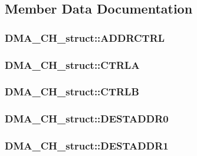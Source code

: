 \subsection{Member Data Documentation}
\hypertarget{struct_d_m_a___c_h__struct_ac9ba7423a26633cd02ba071d51efb462}{
\subsubsection[{ADDRCTRL}]{ {\bf DMA\_\-CH\_\-struct::ADDRCTRL}}}
\label{struct_d_m_a___c_h__struct_ac9ba7423a26633cd02ba071d51efb462}
\hypertarget{struct_d_m_a___c_h__struct_a9dc82f50a4d2adc12b6e03da53bd9e51}{
\subsubsection[{CTRLA}]{ {\bf DMA\_\-CH\_\-struct::CTRLA}}}
\label{struct_d_m_a___c_h__struct_a9dc82f50a4d2adc12b6e03da53bd9e51}
\hypertarget{struct_d_m_a___c_h__struct_ab70537e6496c0d1fcd45133cda6a5df7}{
\subsubsection[{CTRLB}]{ {\bf DMA\_\-CH\_\-struct::CTRLB}}}
\label{struct_d_m_a___c_h__struct_ab70537e6496c0d1fcd45133cda6a5df7}
\hypertarget{struct_d_m_a___c_h__struct_afa47d736bb54f4cb2427d2dc757bc1a6}{
\subsubsection[{DESTADDR0}]{ {\bf DMA\_\-CH\_\-struct::DESTADDR0}}}
\label{struct_d_m_a___c_h__struct_afa47d736bb54f4cb2427d2dc757bc1a6}
\hypertarget{struct_d_m_a___c_h__struct_a40f4d7d2fc0ef7aed055d74360d95112}{
\subsubsection[{DESTADDR1}]{ {\bf DMA\_\-CH\_\-struct::DESTADDR1}}}
